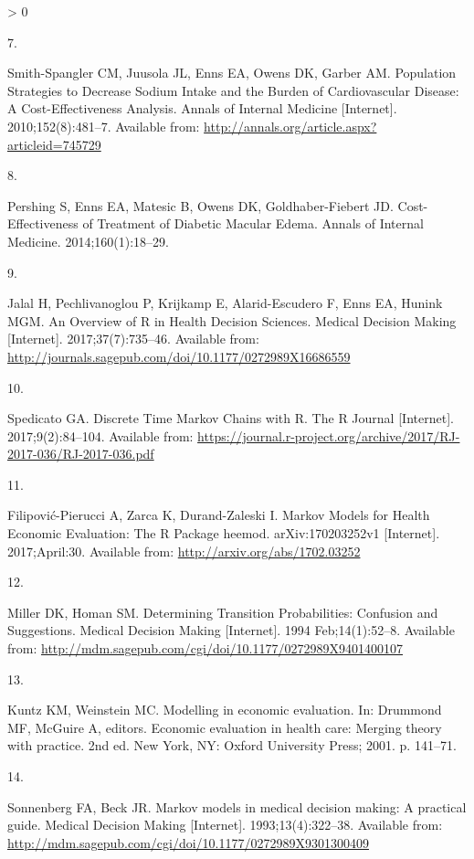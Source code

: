 \documentclass[
]{article}
\newlength{\cslhangindent}
\newlength{\csllabelwidth}
\newenvironment{CSLReferences}[2] %
 {%
  \setlength{\parindent}{0pt}
  \ifodd #1 \everypar{\setlength{\hangindent}{\cslhangindent}}\ignorespaces\fi
  \ifnum #2 > 0
  \setlength{\parskip}{#2\baselineskip}
  \fi
 }%
 {}
\newcommand{\CSLLeftMargin}[1]{\parbox[t]{\csllabelwidth}{#1}}
\newcommand{\CSLRightInline}[1]{\parbox[t]{\linewidth - \csllabelwidth}{#1}\break}
\begin{document}
\begin{CSLReferences}{0}{0}
\leavevmode\hypertarget{ref-Smith-Spangler2010}{}%
\CSLLeftMargin{7. }
\CSLRightInline{Smith-Spangler CM, Juusola JL, Enns EA, Owens DK, Garber AM. {Population Strategies to Decrease Sodium Intake and the Burden of Cardiovascular Disease: A Cost-Effectiveness Analysis}. Annals of Internal Medicine {[}Internet{]}. 2010;152(8):481--7. Available from: \url{http://annals.org/article.aspx?articleid=745729}}

\leavevmode\hypertarget{ref-Pershing2014}{}%
\CSLLeftMargin{8. }
\CSLRightInline{Pershing S, Enns EA, Matesic B, Owens DK, Goldhaber-Fiebert JD. {Cost-Effectiveness of Treatment of Diabetic Macular Edema}. Annals of Internal Medicine. 2014;160(1):18--29. }

\leavevmode\hypertarget{ref-Jalal2017b}{}%
\CSLLeftMargin{9. }
\CSLRightInline{Jalal H, Pechlivanoglou P, Krijkamp E, Alarid-Escudero F, Enns EA, Hunink MGM. {An Overview of R in Health Decision Sciences}. Medical Decision Making {[}Internet{]}. 2017;37(7):735--46. Available from: \url{http://journals.sagepub.com/doi/10.1177/0272989X16686559}}

\leavevmode\hypertarget{ref-Spedicato2017}{}%
\CSLLeftMargin{10. }
\CSLRightInline{Spedicato GA. {Discrete Time Markov Chains with R}. The R Journal {[}Internet{]}. 2017;9(2):84--104. Available from: \url{https://journal.r-project.org/archive/2017/RJ-2017-036/RJ-2017-036.pdf}}

\leavevmode\hypertarget{ref-Filipovic-Pierucci2017}{}%
\CSLLeftMargin{11. }
\CSLRightInline{Filipović-Pierucci A, Zarca K, Durand-Zaleski I. {Markov Models for Health Economic Evaluation: The R Package heemod}. arXiv:170203252v1 {[}Internet{]}. 2017;April:30. Available from: \url{http://arxiv.org/abs/1702.03252}}

\leavevmode\hypertarget{ref-Miller1994}{}%
\CSLLeftMargin{12. }
\CSLRightInline{Miller DK, Homan SM. {Determining Transition Probabilities: Confusion and Suggestions}. Medical Decision Making {[}Internet{]}. 1994 Feb;14(1):52--8. Available from: \url{http://mdm.sagepub.com/cgi/doi/10.1177/0272989X9401400107}}

\leavevmode\hypertarget{ref-Kuntz2001}{}%
\CSLLeftMargin{13. }
\CSLRightInline{Kuntz KM, Weinstein MC. {Modelling in economic evaluation}. In: Drummond MF, McGuire A, editors. Economic evaluation in health care: Merging theory with practice. 2nd ed. New York, NY: Oxford University Press; 2001. p. 141--71. }

\leavevmode\hypertarget{ref-Sonnenberg1993}{}%
\CSLLeftMargin{14. }
\CSLRightInline{Sonnenberg FA, Beck JR. {Markov models in medical decision making: A practical guide}. Medical Decision Making {[}Internet{]}. 1993;13(4):322--38. Available from: \url{http://mdm.sagepub.com/cgi/doi/10.1177/0272989X9301300409}}


\end{CSLReferences}
\end{document}
